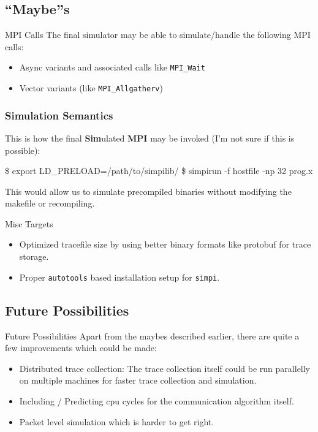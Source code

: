 \documentclass[pdf]{beamer}
\begin{document}
\subsection{``Maybe''s}
\begin{frame}{MPI Calls}
  The final simulator may be able to simulate/handle the following MPI calls:
  \begin{itemize}
    \item Async variants and associated calls like \texttt{MPI\_Wait}
    \item Vector variants (like \texttt{MPI\_Allgatherv})
  \end{itemize}
\end{frame}
\begin{frame}[fragile]
  \frametitle{Simulation Semantics}
  This is how the final \textbf{Sim}ulated \textbf{MPI} may be invoked (I'm not
  sure if this is possible):
\begin{semiverbatim}
\$ export LD_PRELOAD=/path/to/simpilib/
\$ simpirun -f hostfile -np 32 prog.x
\end{semiverbatim}
  This would allow us to simulate precompiled binaries without modifying the
  makefile or recompiling.
\end{frame}
\begin{frame}{Misc Targets}
  \begin{itemize}
    \item<1-> Optimized tracefile size by using better binary formats like
      protobuf for trace storage.
    \item<2-> Proper \texttt{autotools} based installation setup for
      \texttt{simpi}.
  \end{itemize}
\end{frame}
\subsection{Future Possibilities}
\begin{frame}{Future Possibilities}
  Apart from the maybes described earlier, there are quite a few improvements
  which could be made:
  \begin{itemize}
    \item Distributed trace collection: The trace collection itself could be run
      parallelly on multiple machines for faster trace collection and simulation.
    \item Including / Predicting cpu cycles for the communication algorithm
      itself.
    \item Packet level simulation which is harder to get right.
  \end{itemize}
\end{frame}
\end{document}
